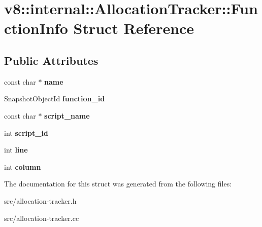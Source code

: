 \hypertarget{structv8_1_1internal_1_1_allocation_tracker_1_1_function_info}{}\section{v8\+:\+:internal\+:\+:Allocation\+Tracker\+:\+:Function\+Info Struct Reference}
\label{structv8_1_1internal_1_1_allocation_tracker_1_1_function_info}
\subsection*{Public Attributes}
\begin{DoxyCompactItemize}
\item 
\hypertarget{structv8_1_1internal_1_1_allocation_tracker_1_1_function_info_ae33f02d99a3e461828e2656809c77b2f}{}const char $\ast$ {\bfseries name}\label{structv8_1_1internal_1_1_allocation_tracker_1_1_function_info_ae33f02d99a3e461828e2656809c77b2f}

\item 
\hypertarget{structv8_1_1internal_1_1_allocation_tracker_1_1_function_info_a5ba77f100a28524f998ba3efd87771f4}{}Snapshot\+Object\+Id {\bfseries function\+\_\+id}\label{structv8_1_1internal_1_1_allocation_tracker_1_1_function_info_a5ba77f100a28524f998ba3efd87771f4}

\item 
\hypertarget{structv8_1_1internal_1_1_allocation_tracker_1_1_function_info_a5e617e59a73c7aeb154eb48504f1e879}{}const char $\ast$ {\bfseries script\+\_\+name}\label{structv8_1_1internal_1_1_allocation_tracker_1_1_function_info_a5e617e59a73c7aeb154eb48504f1e879}

\item 
\hypertarget{structv8_1_1internal_1_1_allocation_tracker_1_1_function_info_a3a8b62dc5e0a9adac5805d16cdebd54a}{}int {\bfseries script\+\_\+id}\label{structv8_1_1internal_1_1_allocation_tracker_1_1_function_info_a3a8b62dc5e0a9adac5805d16cdebd54a}

\item 
\hypertarget{structv8_1_1internal_1_1_allocation_tracker_1_1_function_info_ac110826fbee56f72da27e835ec5b5150}{}int {\bfseries line}\label{structv8_1_1internal_1_1_allocation_tracker_1_1_function_info_ac110826fbee56f72da27e835ec5b5150}

\item 
\hypertarget{structv8_1_1internal_1_1_allocation_tracker_1_1_function_info_a71c34c3ca4aac838c46922665be8c856}{}int {\bfseries column}\label{structv8_1_1internal_1_1_allocation_tracker_1_1_function_info_a71c34c3ca4aac838c46922665be8c856}

\end{DoxyCompactItemize}


The documentation for this struct was generated from the following files\+:\begin{DoxyCompactItemize}
\item 
src/allocation-\/tracker.\+h\item 
src/allocation-\/tracker.\+cc\end{DoxyCompactItemize}
